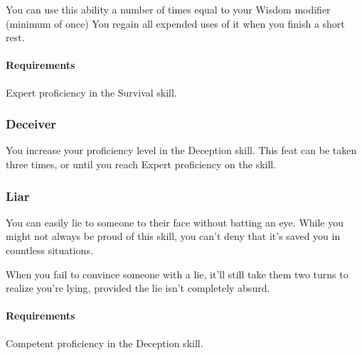     You can use this ability a number of times equal to your Wisdom modifier (minimum of once)
     You regain all expended uses of it when you finish a short rest.
    \paragraph{Requirements} Expert proficiency in the Survival skill.
\subsubsection{Deceiver} \label{feat::deceiver}
    You increase your proficiency level in the Deception skill.
    This feat can be taken three times, or until you reach Expert proficiency on the skill.
\subsubsection{Liar} \label{feat::liar}
    You can easily lie to someone to their face without batting an eye.
    While you might not always be proud of this skill, you can't deny that it's saved you in countless situations.

    When you fail to convince someone with a lie, it'll still take them two turns to realize you're lying, provided the lie isn't completely absurd.
    \paragraph{Requirements} Competent proficiency in the Deception skill.
%
%
%
